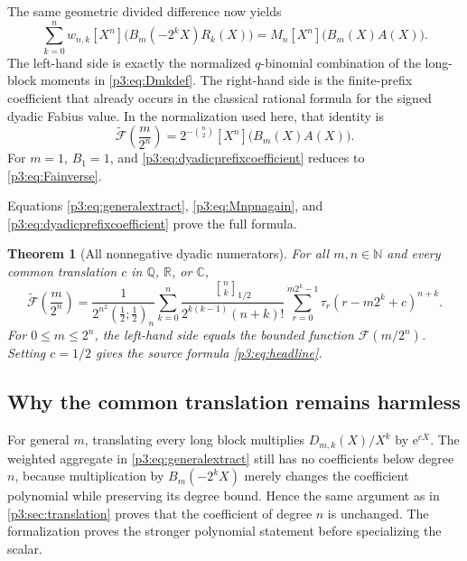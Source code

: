 \documentclass[11pt,oneside]{article}
\newtheorem{theorem}{Theorem}[section]
\theoremstyle{definition}
\theoremstyle{remark}
\newcommand{\qpoch}[3]{\left(#1;#2\right)_{#3}}
\newcommand{\halfqbinom}[2]{{\genfrac{[}{]}{0pt}{}{#1}{#2}}_{1/2}}
\newcommand{\F}{\mathcal F}
\newcommand{\G}{\widetilde{\mathcal F}}
\newcommand{\coeff}[2]{\left[#1^{#2}\right]}
\newcommand{\N}{\mathbb N}
\newcommand{\Q}{\mathbb Q}
\newcommand{\R}{\mathbb R}
\newcommand{\C}{\mathbb C}
\newcommand{\e}{\mathrm e}
\newcommand{\tm}{\tau}
\begin{document}
The same geometric divided difference now yields
\begin{equation}\label{p3:eq:generalextract}
 \sum_{k=0}^{n}w_{n,k}
 \coeff{X}{n}\bigl(B_m(-2^kX)R_k(X)\bigr)
 =M_n\coeff{X}{n}\bigl(B_m(X)A(X)\bigr).
\end{equation}
The left-hand side is exactly the normalized $q$-binomial combination of
the long-block moments in \eqref{p3:eq:Dmkdef}.  The right-hand side is the
finite-prefix coefficient that already occurs in the classical rational
formula for the signed dyadic Fabius value.  In the normalization used here,
that identity is
\begin{equation}\label{p3:eq:dyadicprefixcoefficient}
 \boxed{
 \G\!\left(\frac{m}{2^n}\right)
 =2^{-\binom n2}\coeff{X}{n}\bigl(B_m(X)A(X)\bigr).}
\end{equation}
For $m=1$, $B_1=1$, and \eqref{p3:eq:dyadicprefixcoefficient} reduces to
\eqref{p3:eq:Fainverse}.

Equations \eqref{p3:eq:generalextract}, \eqref{p3:eq:Mnpnagain}, and
\eqref{p3:eq:dyadicprefixcoefficient} prove the full formula.

\begin{theorem}[All nonnegative dyadic numerators]\label{p3:thm:alldyadic}
For all $m,n\in\N$ and every common translation $c$ in $\Q$, $\R$, or
$\C$,
\begin{equation}\label{p3:eq:alldyadic}
\boxed{
\G\!\left(\frac{m}{2^n}\right)
=
\frac{1}{2^{n^2}\qpoch{\frac12}{\frac12}{n}}
\sum_{k=0}^{n}
\frac{\halfqbinom{n}{k}}
     {2^{k(k-1)}(n+k)!}
\sum_{r=0}^{m2^k-1}
\tm_r(r-m2^k+c)^{n+k}.}
\end{equation}
For $0\le m\le2^n$, the left-hand side equals the bounded function
$\F(m/2^n)$.  Setting $c=1/2$ gives the source formula
\eqref{p3:eq:headline}.
\end{theorem}

\subsection{Why the common translation remains harmless}

For general $m$, translating every long block multiplies
$D_{m,k}(X)/X^k$ by $\e^{cX}$.  The weighted aggregate in
\eqref{p3:eq:generalextract} still has no coefficients below degree $n$,
because multiplication by $B_m(-2^kX)$ merely changes the coefficient
polynomial while preserving its degree bound.  Hence the same argument as in
\cref{p3:sec:translation} proves that the coefficient of degree $n$ is
unchanged.  The formalization proves the stronger polynomial statement before
specializing the scalar.
\end{document}
